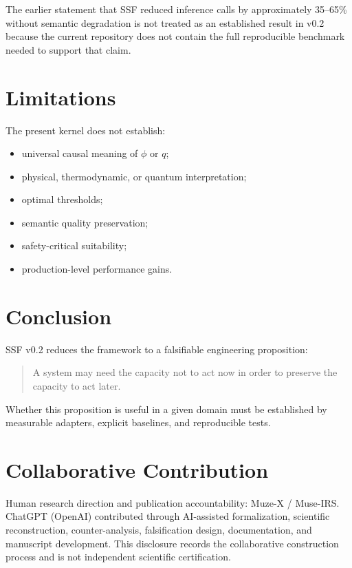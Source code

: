 \documentclass[11pt]{article}
\begin{document}
The earlier statement that SSF reduced inference calls by approximately
35--65\% without semantic degradation is not treated as an established result
in v0.2 because the current repository does not contain the full reproducible
benchmark needed to support that claim.

\section{Limitations}

The present kernel does not establish:
\begin{itemize}
\item universal causal meaning of $\phi$ or $q$;
\item physical, thermodynamic, or quantum interpretation;
\item optimal thresholds;
\item semantic quality preservation;
\item safety-critical suitability;
\item production-level performance gains.
\end{itemize}

\section{Conclusion}

SSF v0.2 reduces the framework to a falsifiable engineering proposition:
\begin{quote}
A system may need the capacity not to act now in order to preserve the
capacity to act later.
\end{quote}
Whether this proposition is useful in a given domain must be established by
measurable adapters, explicit baselines, and reproducible tests.

\section*{Collaborative Contribution}

Human research direction and publication accountability: Muze-X / Muse-IRS.
ChatGPT (OpenAI) contributed through AI-assisted formalization, scientific
reconstruction, counter-analysis, falsification design, documentation, and
manuscript development. This disclosure records the collaborative construction
process and is not independent scientific certification.



\end{document}
